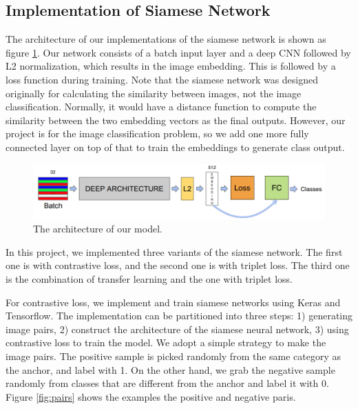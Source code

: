 \subsection{Implementation of Siamese Network}

The architecture of our implementations of the siamese network is shown as figure \ref{fig:model}. Our network consists of a batch input layer and a deep CNN followed by L2 normalization, which results in the image embedding. This is followed by a loss function during training. Note that the siamese network was designed originally for calculating the similarity between images, not the image classification. Normally, it would have a distance function to compute the similarity between the two embedding vectors as the final outputs. However, our project is for the image classification problem, so we add one more fully connected layer on top of that to train the embeddings to generate class output. 

\begin{figure}[h]
  \centering
  \includegraphics[width=\linewidth]{figs/model.png}
  \caption{The architecture of our model.}
  \label{fig:model}
\end{figure}

In this project, we implemented three variants of the siamese network. The first one is with contrastive loss, and the second one is with triplet loss. The third one is the combination of transfer learning and the one with triplet loss.

For contrastive loss, we implement and train siamese networks using Keras and Tensorflow. The implementation can be partitioned into three steps: 1) generating image pairs, 2) construct the architecture of the siamese neural network, 3) using contrastive loss to train the model. We adopt a simple strategy to make the image pairs. The positive sample is picked randomly from the same category as the anchor, and label with 1. On the other hand, we grab the negative sample randomly from classes that are different from the anchor and label it with 0. Figure \ref{fig:pairs} shows the examples the positive and negative paris. 


